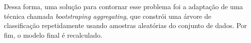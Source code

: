 
Dessa forma, uma solução para contornar esse problema foi a adaptação de uma técnica chamada \emph{bootstraping aggregating}, que constrói uma árvore de classificação repetidamente usando amostras aleatórias do conjunto de dados. Por fim, o modelo final é recalculado.
